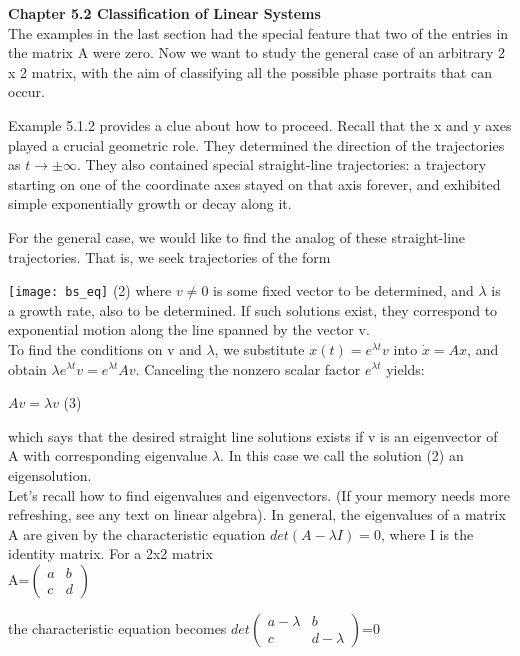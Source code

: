 \documentclass{article}
\newcommand\tab[1][1cm]{\hspace*{#1}}
\begin{document}
\textbf {Chapter 5.2 Classification of Linear Systems}
\\ \tab The examples in the last section had the special feature that two of the entries in the matrix A were zero. Now we want to study the general case of an arbitrary 2 x 2 matrix, with the aim of classifying all the possible phase portraits that can occur. \\ \tab

Example 5.1.2 provides a clue about how to proceed. Recall that the x and y axes played a crucial geometric role. They determined the direction of the trajectories as $t \to \pm \infty$. They also contained special straight-line trajectories: a trajectory starting on one of the coordinate axes stayed on that axis forever, and exhibited simple exponentially growth or decay along it. \\ \tab

For the general case, we would like to find the analog of these straight-line trajectories. That is, we seek trajectories of the form 

\texttt{[image: bs\_eq]} \tab (2)
where $v \neq 0$ is some fixed vector to be determined, and $\lambda$ is a growth rate, also to be determined. If such solutions exist, they correspond to exponential motion along the line spanned by the vector v. \\ \tab
To find the conditions on v and $\lambda$, we substitute $x(t)=e^{\lambda{t}}v$ into $\dot{x}=Ax$, and obtain $\lambda e^{\lambda{t}}v = e^{\lambda{t}}Av$. Canceling the nonzero scalar factor $e^{\lambda{t}}$ yields:
\begin{center}
$Av = \lambda v$ \tab (3)
\end{center}

which says that the desired straight line solutions exists if v is an eigenvector of A with corresponding eigenvalue $\lambda$. In this case we call the solution (2) an eigensolution. \\ \tab
Let's recall how to find eigenvalues and eigenvectors. (If your memory needs more refreshing, see any text on linear algebra). In general, the eigenvalues of a matrix A are given by the characteristic equation $det(A-\lambda I)=0$, where I is the identity matrix. For a 2x2 matrix \\ \tab
{A=$
\begin{pmatrix}
a & b \\ 
c & d
\end{pmatrix}
$}

the characteristic equation becomes
{$det 
\begin{pmatrix}
a-\lambda & b \\
c & d-\lambda
\end{pmatrix}
$=0}
\end{document}
